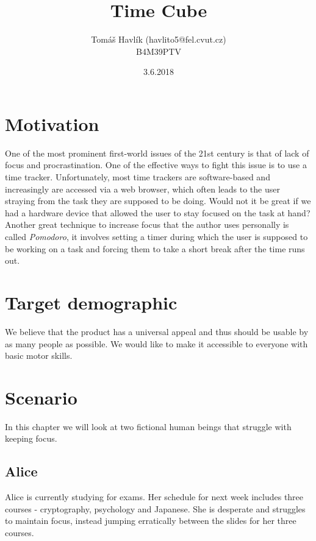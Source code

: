 \documentclass{article}
\title{Time Cube}
\author{Tomáš Havlík (havlito5@fel.cvut.cz)\\B4M39PTV}
\date{3.6.2018}
\begin{document}
\maketitle

\tableofcontents

\newpage

\section{Motivation}

One of the most prominent first-world issues of the 21st century is that of lack of focus and procrastination. One of the effective ways to fight this issue is to use a time tracker. Unfortunately, most time trackers are software-based and increasingly are accessed via a web browser, which often leads to the user straying from the task they are supposed to be doing. Would not it be great if we had a hardware device that allowed the user to stay focused on the task at hand?\\

Another great technique to increase focus that the author uses personally is called \textit{Pomodoro}, it involves setting a timer during which the user is supposed to be working on a task and forcing them to take a short break after the time runs out.\\

\section{Target demographic}

We believe that the product has a universal appeal and thus should be usable by as many people as possible. We would like to make it accessible to everyone with basic motor skills.

\section{Scenario}

In this chapter we will look at two fictional human beings that struggle with keeping focus.

\subsection{Alice}

Alice is currently studying for exams. Her schedule for next week includes three courses - cryptography, psychology and Japanese. She is desperate and struggles to maintain focus, instead jumping erratically between the slides for her three courses.
\end{document}
